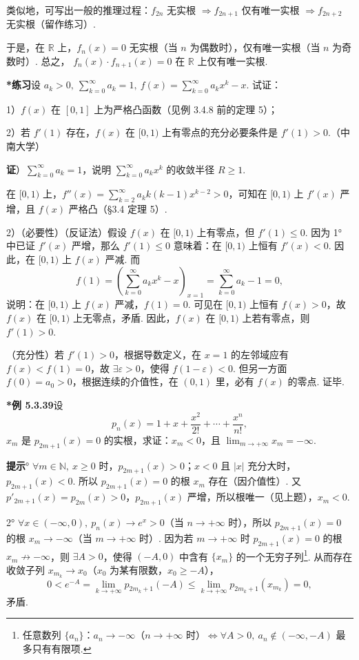 \documentclass[UTF8, 12pt, fontset=fandol, oneside]{ctexart}
\begin{document}
类似地，可写出一般的推理过程：$f_{2n}$ 无实根 $\Rightarrow f_{2n+1}$ 仅有唯一实根
$\Rightarrow f_{2n+2}$ 无实根（留作练习）.

于是，在 $\mathbb R$ 上，$f_n(x)=0$ 无实根（当 $n$ 为偶数时），仅有唯一实根（当 $n$ 为奇数时）. 总之，
$f_n(x)\cdot f_{n+1}(x)=0$ 在 $\mathbb R$ 上仅有唯一实根.

\noindent\textbf{*练习}\quad 设 $a_k>0,\ \displaystyle\sum_{k=0}^{\infty}a_k=1,\ f(x)=\displaystyle\sum_{k=0}^{\infty}a_kx^k-x$. 试证：

1）$f(x)$ 在 $[0,1]$ 上为严格凸函数（见例 3.4.8 前的定理 5）；

2）若 $f'(1)$ 存在，$f(x)$ 在 $[0,1)$ 上有零点的充分必要条件是 $f'(1)>0$.（中南大学）

\noindent\textbf{证}）$\displaystyle\sum_{k=0}^{\infty}a_k=1$，说明 $\displaystyle\sum_{k=0}^{\infty}a_kx^k$ 的收敛半径 $R\ge1$.

在 $[0,1)$ 上，$f''(x)=\displaystyle\sum_{k=2}^{\infty}a_kk(k-1)x^{k-2}>0$，可知在 $[0,1)$ 上 $f'(x)$ 严增，且 $f(x)$ 严格凸（§3.4 定理 5）.

2）（必要性）（反证法）假设 $f(x)$ 在 $[0,1)$ 上有零点，但 $f'(1)\le0$. 因为 1° 中已证 $f'(x)$ 严增，那么 $f'(1)\le0$ 意味着：在 $[0,1)$ 上恒有 $f'(x)<0$. 因此，在 $[0,1)$ 上 $f(x)$ 严减. 而
\[
  f(1)=\left(\sum_{k=0}^{\infty}a_kx^k-x\right)_{x=1}
  =\sum_{k=0}^{\infty}a_k-1=0,
\]
说明：在 $[0,1)$ 上 $f(x)$ 严减，$f(1)=0$. 可见在 $[0,1)$ 上恒有 $f(x)>0$，故 $f(x)$ 在 $[0,1)$ 上无零点，矛盾. 因此，$f(x)$ 在 $[0,1)$ 上若有零点，则 $f'(1)>0$.

（充分性）若 $f'(1)>0$，根据导数定义，在 $x=1$ 的左邻域应有 $f(x)<f(1)=0$，故 $\exists\varepsilon>0$，使得 $f(1-\varepsilon)<0$. 但另一方面 $f(0)=a_0>0$，根据连续的介值性，在 $(0,1)$ 里，必有 $f(x)$ 的零点. 证毕.

\noindent\textbf{*例 5.3.39}\quad 设
\[
  p_n(x)=1+x+\frac{x^2}{2!}+\cdots+\frac{x^n}{n!},
\]
$x_m$ 是 $p_{2m+1}(x)=0$ 的实根，求证：$x_m<0$，且 $\displaystyle\lim_{m\to+\infty}x_m=-\infty$.

\noindent\textbf{提示}° $\forall m\in\mathbb N,\ x\ge0$ 时，$p_{2m+1}(x)>0$；$x<0$ 且 $|x|$ 充分大时，$p_{2m+1}(x)<0$. 所以 $p_{2m+1}(x)=0$ 的根 $x_m$ 存在（因介值性）. 又 $p'_{2m+1}(x)=p_{2m}(x)>0$，$p_{2m+1}(x)$ 严增，所以根唯一（见上题），$x_m<0$.

2° $\forall x\in(-\infty,0),\ p_n(x)\to e^x>0$（当 $n\to+\infty$ 时），所以 $p_{2m+1}(x)=0$ 的根 $x_m\to-\infty$（当 $m\to+\infty$ 时）. 因为若 $m\to+\infty$ 时 $p_{2m+1}(x)=0$ 的根 $x_m\not\to-\infty$，则 $\exists A>0$，使得 $(-A,0)$ 中含有 $\{x_m\}$ 的一个无穷子列\footnote{任意数列 $\{a_n\}$：$a_n\to-\infty$（$n\to+\infty$ 时）$\Leftrightarrow\forall A>0,\ a_n\notin(-\infty,-A)$ 最多只有有限项.}. 从而存在收敛子列 $x_{m_k}\to x_0$（$x_0$ 为某有限数，$x_0\ge-A$），
\[
  0<e^{-A}=\lim_{k\to+\infty}p_{2m_k+1}(-A)
  \le \lim_{k\to+\infty}p_{2m_k+1}(x_{m_k})=0,
\]
矛盾.
\end{document}
